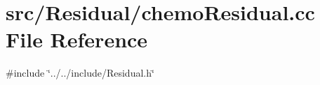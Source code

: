 \section{src/\+Residual/chemo\+Residual.cc File Reference}
\label{chemo_residual_8cc}
{\ttfamily \#include \char`\"{}../../include/\+Residual.\+h\char`\"{}}\newline
